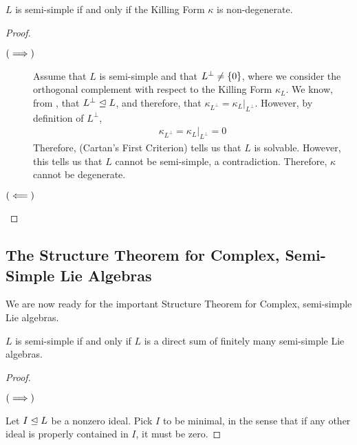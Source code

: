 \begin{boxtheorem}\label{SP:Thm:CartanII}
    $L$ is semi-simple if and only if the Killing Form $\kappa$ is non-degenerate.
\end{boxtheorem}
\begin{proof}
    \begin{description}
        \item[$\left( \implies \right)$]
        Assume that $L$ is semi-simple and that $L^\perp \neq \left\{ 0 \right\}$, where we consider the orthogonal complement with respect to the Killing Form $\kappa_L$. We know, from , that $L^\perp \trianglelefteq L$, and therefore, that $\kappa_{L^\perp} = \kappa_L\vert_{L^\perp}$. However, by definition of $L^\perp$,
        \begin{align*}
            \kappa_{L^\perp} = \kappa_L\vert_{L^\perp} = 0
        \end{align*}
        Therefore,  (Cartan's First Criterion) tells us that $L$ is solvable. However, this tells us that $L$ cannot be semi-simple, a contradiction. Therefore, $\kappa$ cannot be degenerate.
        
        \item[$\left( \impliedby \right)$] \sorry %
    \end{description}
\end{proof}

\subsection{The Structure Theorem for Complex, Semi-Simple Lie Algebras}

We are now ready for the important Structure Theorem for Complex, semi-simple Lie algebras.

\begin{boxtheorem}\label{SP:Thm:Structure}
    $L$ is semi-simple if and only if $L$ is a direct sum of finitely many semi-simple Lie algebras.
\end{boxtheorem}

\begin{proof}
    \begin{description}
        \item[$\left( \implies \right)$] 
    \end{description}
    Let $I \trianglelefteq L$ be a nonzero ideal. Pick $I$ to be minimal, in the sense that if any other ideal is properly contained in $I$, it must be zero.
    \sorry %

\end{proof}
